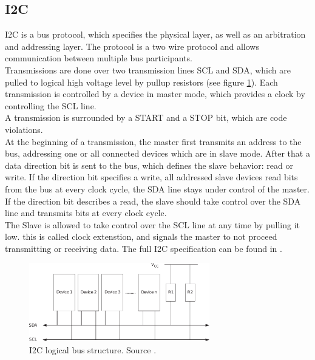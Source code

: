 \documentclass[a4paper]{scrreprt}
\begin{document}
\subsection{I2C}
I2C is a bus protocol, which specifies the physical layer, as well as an arbitration and addressing layer. The protocol is a two wire protocol and allows communication between multiple bus participants.\\
Transmissions are done over two transmission lines SCL and SDA, which
are pulled to logical high voltage level by pullup resistors (see
figure \ref{fig:i2c}). Each transmission is controlled by a device
in master mode, which provides a clock by controlling the SCL line.\\
A transmission is surrounded by a START and a STOP bit, which are code violations.\\
At the beginning of a transmission, the master first transmits an
address to the bus, addressing one or all connected devices which
are in slave mode. After that a data direction bit is sent to the
bus, which defines the slave behavior: read or write. If the direction bit specifies a write, all addressed slave devices read bits from the bus at every 
clock cycle, the SDA line stays under control of the master. If the
direction bit describes a read, the slave should take control over
the SDA line and transmits bits at every clock cycle.\\
The Slave is allowed to take control over the SCL line at any time
by pulling it low. this is called clock extenstion, and signals the
master to not proceed transmitting or receiving data.
The full I2C specification can be found in \cite{i2c}.
\begin{figure}[Hh!]
	\centering
	\includegraphics[width=0.7\textwidth]{img/i2c.pdf}
  \caption{I2C logical bus structure. Source \cite{i2c}.}
	\label{fig:i2c}
\end{figure}
\end{document}
